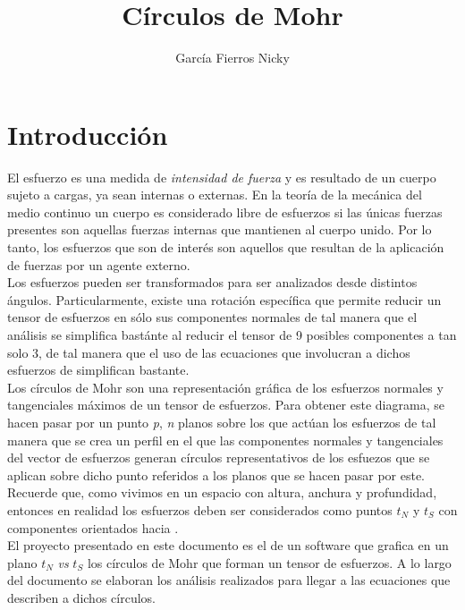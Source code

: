 \documentclass{article}
\title{Círculos de Mohr}
\author{García Fierros Nicky}
\begin{document}
    \maketitle
    \newpage
    
    \tableofcontents
    \newpage

    \section{Introducción}

    El esfuerzo es una medida de \textit{intensidad de fuerza} y es resultado de un 
    cuerpo sujeto a cargas, ya sean internas o externas. En la teoría de la mecánica
    del medio continuo un cuerpo es considerado libre de esfuerzos si las únicas
    fuerzas presentes son aquellas fuerzas internas que mantienen al cuerpo unido.
    Por lo tanto, los esfuerzos que son de interés son aquellos que resultan de la
    aplicación de fuerzas por un agente externo.\\

    Los esfuerzos pueden ser transformados para ser analizados desde distintos ángulos.
    Particularmente, existe una rotación específica que permite reducir un tensor de
    esfuerzos en sólo sus componentes normales de tal manera que el análisis se
    simplifica bastánte al reducir el tensor de 9 posibles componentes a tan solo 3, de
    tal manera que el uso de las ecuaciones que involucran a dichos esfuerzos de
    simplifican bastante.\\
    
    Los círculos de Mohr son una representación gráfica de los esfuerzos normales y
    tangenciales máximos de un tensor de esfuerzos. Para obtener este diagrama, se
    hacen pasar por un punto \textit{p}, \textit{n} planos \bm{$\eta$} sobre
    los que actúan los esfuerzos de tal manera que se crea un perfil en el que
    las componentes normales y tangenciales del vector de esfuerzos  generan círculos
    representativos de los esfuezos que se aplican sobre dicho punto referidos a los
    planos \bm{$\eta$} que se hacen pasar por este. Recuerde que, como vivimos en
    un espacio con altura, anchura y profundidad, entonces en realidad los esfuerzos
    deben ser considerados como puntos ${t}_{N}$ y ${t}_{S}$ con componentes
    orientados hacia \bm{${\eta}$}.\\

    El proyecto presentado en este documento es el de un software que grafica en un plano
    ${t}_{N}$ \textit{vs} ${t}_{S}$ los círculos de Mohr que forman un tensor de esfuerzos.
    A lo largo del documento se elaboran los análisis realizados para llegar a las 
    ecuaciones que describen a dichos círculos.
\end{document}
